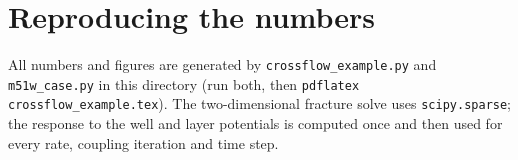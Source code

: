 \documentclass[11pt,a4paper]{article}
\begin{document}
\appendix
\section{Reproducing the numbers}
All numbers and figures are generated by \texttt{crossflow\_example.py} and
\texttt{m51w\_case.py} in this directory (run both, then \texttt{pdflatex crossflow\_example.tex}).
The two-dimensional fracture solve uses \texttt{scipy.sparse}; the response to the well and
layer potentials is computed once and then used for every rate, coupling iteration and time
step.
\end{document}
